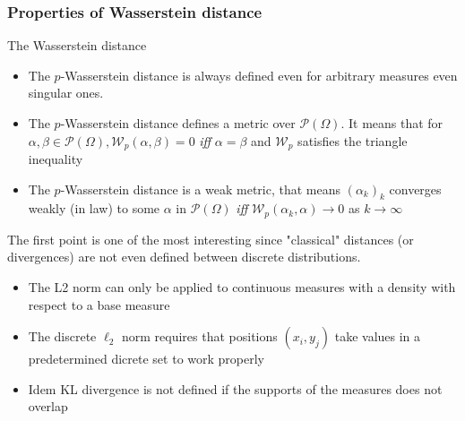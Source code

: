 \documentclass[french,9pt]{beamer}
\begin{document}
\begin{frame}
  \frametitle{Properties of Wasserstein distance}
  
  \begin{block}{The Wasserstein distance}
  \begin{itemize}
  \item The $p$-Wasserstein distance is always defined even for arbitrary measures even singular ones.
  \item The $p$-Wasserstein distance defines a metric over $\mathcal{P}(\Omega)$. It means that for $\alpha, \beta \in \mathcal{P}(\Omega), \mathcal{W}_{p}(\alpha,\beta)=0$ \textit{iff} $\alpha=\beta$ and $ \mathcal{W}_{p}$ satisfies the triangle inequality
  \item The $p$-Wasserstein distance is a weak metric, that means $(\alpha_{k})_{k}$ converges weakly (in law) to some $\alpha$ in $\mathcal{P}(\Omega)$ \textit{iff} $ \mathcal{W}_{p}(\alpha_{k},\alpha) \rightarrow 0$ as $k \rightarrow \infty$
  \end{itemize}
  \end{block}
  
  \pause
  
  The first point is one of the most interesting since "classical" distances (or divergences) are not even defined between discrete distributions. 
  
  \begin{itemize}
  \item The L2 norm can only be applied to continuous measures with a density with respect to a base measure
  \item The discrete $\ell_{2}$ norm requires that positions $(x_{i}, y_{j})$ take values in a predetermined dicrete set to work properly 
  \item Idem KL divergence is not defined if the supports of the measures does not overlap
  \end{itemize}


\end{frame}

\end{document}
